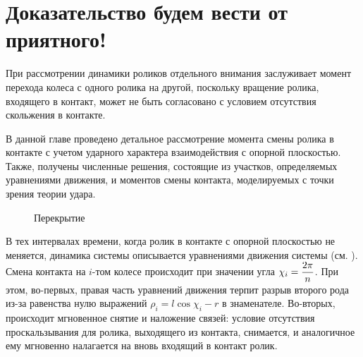 \section{Доказательство будем вести от приятного!}

При рассмотрении динамики роликов отдельного внимания заслуживает момент перехода колеса с одного ролика на другой, поскольку вращение ролика, входящего в контакт, может не быть согласовано с условием отсутствия скольжения в контакте.

В данной главе проведено детальное рассмотрение момента смены ролика в контакте с учетом ударного характера взаимодействия с опорной плоскостью. Также, получены численные решения, состоящие из участков, определяемых уравнениями движения, и моментов смены контакта, моделируемых с точки зрения теории удара.

\begin{figure}
    \minipage{\textwidth}
        \centering
        \caption{Перекрытие}
        \label{fig:overlap}
    \endminipage
\end{figure}

В тех интервалах времени, когда ролик в контакте с опорной плоскостью не меняется, динамика системы описывается уравнениями движения системы (см. \cite{GerasimovZobovaPMM2018}). Смена контакта на $i$-том колесе происходит при значении угла $\chi_i = \displaystyle\frac{\displaystyle 2\pi}{\displaystyle n}$. При этом, во-первых, правая часть уравнений движения терпит разрыв второго рода из-за равенства нулю выражений $\rho_i = l\cos\chi_i-r$ в знаменателе. Во-вторых, происходит мгновенное снятие и наложение связей: условие отсутствия проскальзывания для ролика, выходящего из контакта, снимается, и аналогичное ему мгновенно налагается на вновь входящий в контакт ролик.



